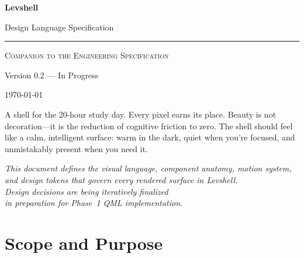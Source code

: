 \documentclass[11pt,a4paper]{article}
\begin{document}
\begin{titlepage}
\centering
\vspace*{2cm}

{\Huge\bfseries\color{NavyBlue} Levshell\par}
\vspace{0.5cm}
{\Large\color{NavyBlue!70} Design Language Specification\par}

\vspace{1cm}
\textcolor{levblue}{\rule{0.6\textwidth}{1pt}}

\vspace{1.5cm}
{\large\textsc{Companion to the Engineering Specification}\par}
\vspace{0.3cm}
{\normalsize Version 0.2 --- In Progress\par}
\vspace{0.3cm}
{\normalsize\today\par}

\vspace{3cm}

\begin{principlebox}
A shell for the 20-hour study day. Every pixel earns its place. Beauty is not decoration---it is the reduction of cognitive friction to zero. The shell should feel like a calm, intelligent surface: warm in the dark, quiet when you're focused, and unmistakably present when you need it.
\end{principlebox}

\vspace{2cm}

{\small\textit{This document defines the visual language, component anatomy, motion system,\\and design tokens that govern every rendered surface in Levshell.\\Design decisions are being iteratively finalized\\in preparation for Phase~1 QML implementation.}\par}

\vfill
\end{titlepage}

\newpage
\tableofcontents
\newpage


\section{Scope and Purpose}
\label{sec:scope}
\end{document}

